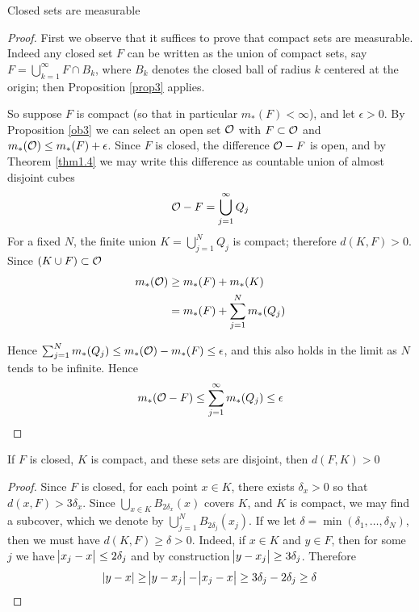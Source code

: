 \documentclass[11pt]{article}
\begin{document}
\begin{proposition}[]
Closed sets are measurable
\end{proposition}
\begin{proof}
First we observe that it suffices to prove that compact sets are measurable.
Indeed any closed set \(F\) can be written as the union of compact sets, say 
\(F=\bigcup_{k=1}^\infty F\cap B_k\), where \(B_k\) denotes the closed ball of
radius \(k\) centered at the origin; then Proposition \ref{prop3} applies.

So suppose \(F\) is compact (so that in particular \(m_*(F)<\infty\)), and let
\(\epsilon>0\). By Proposition \ref{ob3} we can select an open set \(\mathcal{O}\) with
\(F\subset\mathcal{O}\) and \(m_*(\mathcal{O})\le m_*(F)+\epsilon\). Since \(F\) is closed, the
difference \(\mathcal{O}-F\) is open, and by Theorem \ref{thm1.4} we may write this
difference as countable union of almost disjoint cubes
\begin{equation*}
\mathcal{O}-F=\displaystyle\bigcup_{j=1}^\infty Q_j
\end{equation*}
For a fixed \(N\), the finite union \(K=\bigcup_{j=1}^N Q_j\) is compact;
therefore \(d(K,F)>0\). Since \((K\cup F)\subset\mathcal{O}\)
\begin{align*}
m_*(\mathcal{O})&\ge m_*(F)+m_*(K)\\
&=m_*(F)+\displaystyle\sum_{j=1}^Nm_*(Q_j)
\end{align*}

Hence \(\sum_{j=1}^Nm_*(Q_j)\le m_*(\mathcal{O})-m_*(F)\le\epsilon\), and this also
holds in the limit as \(N\) tends to be infinite. Hence
\begin{equation*}
m_*(\mathcal{O}-F)\le \displaystyle\sum_{j=1}^\infty m_*(Q_j)\le\epsilon
\end{equation*}
\end{proof}

\begin{lemma}[]
If \(F\) is closed, \(K\) is compact, and these sets are disjoint, then \(d(F,K)>0\)
\end{lemma}
\begin{proof}
Since \(F\) is closed, for each point \(x\in K\), there exists \(\delta_x>0\) so
that \(d(x,F)>3\delta_x\). Since \(\bigcup_{x\in K}B_{2\delta_x}(x)\) covers \(K\),
and \(K\) is compact, we may find a subcover, which we denote by
\(\bigcup_{j=1}^NB_{2\delta_j}(x_j)\). If we let
\(\delta=\min(\delta_1,\dots,\delta_N)\), then we must have
\(d(K,F)\ge\delta>0\). Indeed, if \(x\in K\) and \(y\in F\), then for some \(j\) we
have \(\abs{x_j-x}\le 2\delta_j\) and by construction
\(\abs{y-x_j}\ge3\delta_j\). Therefore
\begin{equation*}
\abs{y-x}\ge\abs{y-x_j}-\abs{x_j-x}\ge3\delta_j-2\delta_j\ge\delta
\end{equation*}
\end{proof}
\end{document}
